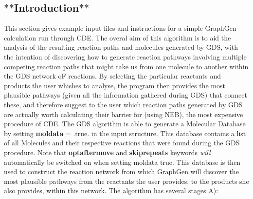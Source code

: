 \subsection*{$\ast$$\ast$\+Introduction$\ast$$\ast$}

This section gives example input files and instructions for a simple Graph\+Gen calculation run through C\+DE. The overal aim of this algorithm is to aid the analysis of the resulting reaction paths and molecules generated by G\+DS, with the intention of discovering how to generate reaction pathways involving multiple competing reaction paths that might take us from one molecule to another within the G\+DS network oF reactions. By selecting the particular reactants and products the user whishes to analyse, the program then provides the most plausible pathways (given all the information gathered during G\+DS) that connect these, and therefore suggest to the user which reaction paths generated by G\+DS are actually worth calculating their barrier for (using N\+EB), the most expensive procedure of C\+DE. The G\+DS algorithm is able to generate a Molecular Database by setting {\bfseries moldata} = .true. in the input structure. This database contains a list of all Molecules and their respective reactions that were found during the G\+DS procedure. Note that {\bfseries optaftermove} and {\bfseries skiprepeats} keywords {\itshape will} automatically be switched on when setting moldata true. This database is then used to construct the reaction network from which Graph\+Gen will discover the most plausible pathways from the reactants the user provides, to the products she also provides, within this network. The algorithm has several stages A)\+:
